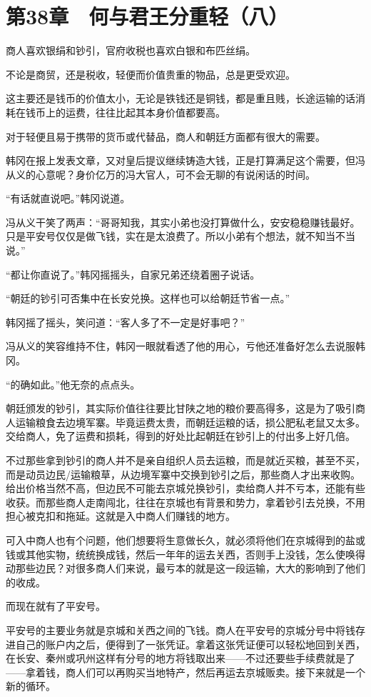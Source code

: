 \section{第38章　何与君王分重轻（八）}

商人喜欢银绢和钞引，官府收税也喜欢白银和布匹丝绢。

不论是商贸，还是税收，轻便而价值贵重的物品，总是更受欢迎。

这主要还是钱币的价值太小，无论是铁钱还是铜钱，都是重且贱，长途运输的话消耗在钱币上的运费，往往比起其本身价值都要高。

对于轻便且易于携带的货币或代替品，商人和朝廷方面都有很大的需要。

韩冈在报上发表文章，又对皇后提议继续铸造大钱，正是打算满足这个需要，但冯从义的心意呢？身价亿万的冯大官人，可不会无聊的有说闲话的时间。

“有话就直说吧。”韩冈说道。

冯从义干笑了两声：“哥哥知我，其实小弟也没打算做什么，安安稳稳赚钱最好。只是平安号仅仅是做飞钱，实在是太浪费了。所以小弟有个想法，就不知当不当说。”

“都让你直说了。”韩冈摇摇头，自家兄弟还绕着圈子说话。

“朝廷的钞引可否集中在长安兑换。这样也可以给朝廷节省一点。”

韩冈摇了摇头，笑问道：“客人多了不一定是好事吧？”

冯从义的笑容维持不住，韩冈一眼就看透了他的用心，亏他还准备好怎么去说服韩冈。

“的确如此。”他无奈的点点头。

朝廷颁发的钞引，其实际价值往往要比甘陕之地的粮价要高得多，这是为了吸引商人运输粮食去边境军寨。毕竟运费太贵，而朝廷运粮的话，损公肥私老鼠又太多。交给商人，免了运费和损耗，得到的好处比起朝廷在钞引上的付出多上好几倍。

不过那些拿到钞引的商人并不是亲自组织人员去运粮，而是就近买粮，甚至不买，而是动员边民/运输粮草，从边境军寨中交换到钞引之后，那些商人才出来收购。给出价格当然不高，但边民不可能去京城兑换钞引，卖给商人并不亏本，还能有些收获。而那些商人走南闯北，往往在京城也有背景和势力，拿着钞引去兑换，不用担心被克扣和拖延。这就是入中商人们赚钱的地方。

可入中商人也有个问题，他们想要将生意做长久，就必须将他们在京城得到的盐或钱或其他实物，统统换成钱，然后一年年的运去关西，否则手上没钱，怎么使唤得动那些边民？对很多商人们来说，最亏本的就是这一段运输，大大的影响到了他们的收成。

而现在就有了平安号。

平安号的主要业务就是京城和关西之间的飞钱。商人在平安号的京城分号中将钱存进自己的账户内之后，便得到了一张凭证。拿着这张凭证便可以轻松地回到关西，在长安、秦州或巩州这样有分号的地方将钱取出来——不过还要些手续费就是了——拿着钱，商人们可以再购买当地特产，然后再运去京城贩卖。接下来就是一个新的循环。

